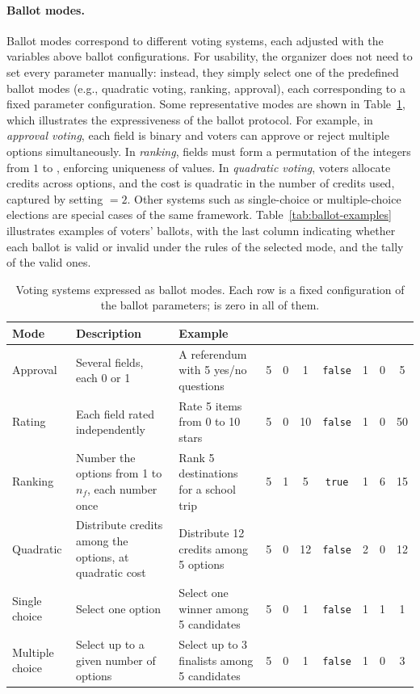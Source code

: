 \paragraph{Ballot modes.}
Ballot modes correspond to different voting systems, each adjusted with the variables above ballot configurations. For usability, the organizer does not need to set every parameter manually: instead, they simply select one of the predefined ballot modes (e.g., quadratic voting, ranking, approval), each corresponding to a fixed parameter configuration. Some representative modes are shown in Table~\ref{tab:ballot-modes}, which illustrates the expressiveness of the ballot protocol. For example, in \emph{approval voting}, each field is binary and voters can approve or reject multiple options simultaneously. In \emph{ranking}, fields must form a permutation of the integers from $1$ to \numfields, enforcing uniqueness of values. In \emph{quadratic voting}, voters allocate credits across options, and the cost is quadratic in the number of credits used, captured by setting \costexponent$=2$. Other systems such as single-choice or multiple-choice elections are special cases of the same framework. Table~\ref{tab:ballot-examples} illustrates examples of voters' ballots, with the last column indicating whether each ballot is valid or invalid under the rules of the selected mode, and the tally of the valid ones.

\begin{table}[h]
	\centering
	\caption{Voting systems expressed as ballot modes. Each row is a fixed configuration of the ballot parameters; \groupsize is zero in all of them.}
	\label{tab:ballot-modes}
	\scriptsize
	\begin{tabular}{p{} p{} p{} c c c c c c c}
		\toprule
		\textbf{Mode} & \textbf{Description} & \textbf{Example} & \rotatebox{90}{\numfields} & \rotatebox{90}{\minvalue} & \rotatebox{90}{\maxvalue} & \rotatebox{90}{\uniquevalues} & \rotatebox{90}{\costexponent} & \rotatebox{90}{\minvaluesum} & \rotatebox{90}{\maxvaluesum} \\
		\midrule
		Approval & Several fields, each 0 or 1 & A referendum with 5 yes/no questions & 5 & 0 & 1 & \texttt{false} & 1 & 0 & 5 \\
		Rating & Each field rated independently & Rate 5 items from 0 to 10 stars & 5 & 0 & 10 & \texttt{false} & 1 & 0 & 50 \\
		Ranking & Number the options from 1 to $n_f$, each number once & Rank 5 destinations for a school trip & 5 & 1 & 5 & \texttt{true} & 1 & 6 & 15 \\
		Quadratic & Distribute credits among the options, at quadratic cost & Distribute 12 credits among 5 options & 5 & 0 & 12 & \texttt{false} & 2 & 0 & 12 \\
		Single choice & Select one option & Select one winner among 5 candidates & 5 & 0 & 1 & \texttt{false} & 1 & 1 & 1 \\
		Multiple choice & Select up to a given number of options & Select up to 3 finalists among 5 candidates & 5 & 0 & 1 & \texttt{false} & 1 & 0 & 3 \\
		\bottomrule
	\end{tabular}
\end{table}

